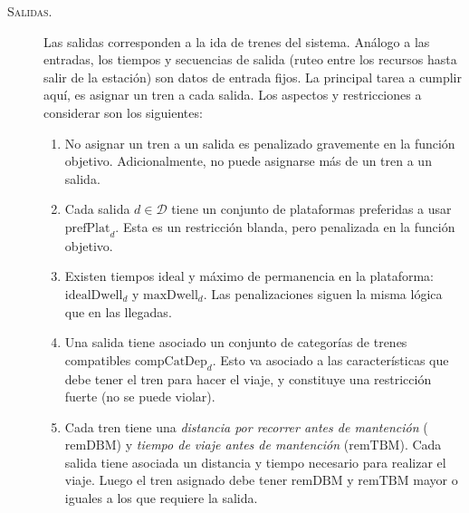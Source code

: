\documentclass[letter, 10pt]{article}
\begin{document}
\begin{description}
    \item[\textsc{Salidas.}]
    Las salidas corresponden a la ida de trenes del sistema. Análogo a las entradas, los tiempos y secuencias de
    salida (ruteo entre los recursos hasta salir de la estación) son datos de entrada fijos. La principal tarea a
    cumplir aquí, es asignar un tren a cada salida. Los aspectos y restricciones a considerar son los siguientes:
    \begin{enumerate}
        \item No asignar un tren a un salida es penalizado gravemente en la función objetivo. Adicionalmente, no
        puede asignarse más de un tren a un salida.
        \item Cada salida $d \in \mathcal{D}$ tiene un conjunto de plataformas preferidas a usar $\text{prefPlat}_d$.
        Esta es un restricción blanda, pero penalizada en la función objetivo.
        \item Existen tiempos ideal y máximo de permanencia en la plataforma: $\text{idealDwell}_d$ y $\text{maxDwell}_d$.
        Las penalizaciones siguen la misma lógica que en las llegadas.
        \item Una salida tiene asociado un conjunto de categorías de trenes compatibles $\text{compCatDep}_d$. Esto va asociado a las características que debe tener el tren para hacer el viaje, y constituye una restricción fuerte
        (no se puede violar).
        \item Cada tren tiene una \textit{distancia por recorrer antes de mantención} ($\text{remDBM}$) y \textit{tiempo de viaje antes de mantención} ($\text{remTBM}$). Cada salida tiene asociada un distancia y tiempo necesario para realizar el viaje. Luego el tren asignado debe tener $\text{remDBM}$ y $\text{remTBM}$ mayor o iguales a los que requiere la salida.

    \end{enumerate}


\end{description}
\end{document}
